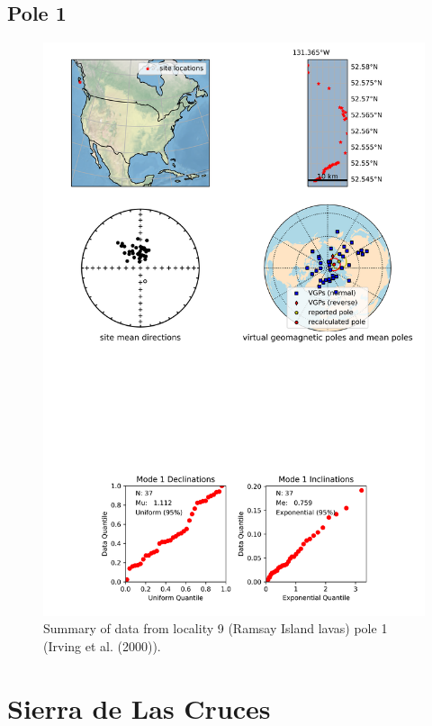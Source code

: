 \subsection{Pole 1}


\begin{figure}[H]
\centering
\includegraphics[width=5 in]{./9/1/pole_summary.png}
\caption{Summary of data from locality 9 (Ramsay Island lavas) pole 1 (Irving et al. (2000)).}
\end{figure}

\section{Sierra de Las Cruces}
